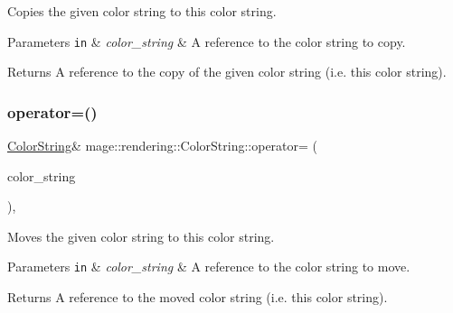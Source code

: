 Copies the given color string to this color string.


\begin{DoxyParams}[1]{Parameters}
\mbox{\tt in}  & {\em color\+\_\+string} & A reference to the color string to copy. \\
\hline
\end{DoxyParams}
\begin{DoxyReturn}{Returns}
A reference to the copy of the given color string (i.\+e. this color string). 
\end{DoxyReturn}
\hypertarget{classmage_1_1rendering_1_1_color_string_aa70b60e0c8528306e7473ee0b5bfbe03}{}\label{classmage_1_1rendering_1_1_color_string_aa70b60e0c8528306e7473ee0b5bfbe03} 
\subsubsection{\texorpdfstring{operator=()}{operator=()}\hspace{0.1cm}{\footnotesize\ttfamily [2/2]}}
{\footnotesize\ttfamily \hyperlink{classmage_1_1rendering_1_1_color_string}{Color\+String}\& mage\+::rendering\+::\+Color\+String\+::operator= (\begin{DoxyParamCaption}\item[{\hyperlink{classmage_1_1rendering_1_1_color_string}{Color\+String} \&\&}]{color\+\_\+string }\end{DoxyParamCaption})\hspace{0.3cm}{\ttfamily [default]}, {\ttfamily [noexcept]}}

Moves the given color string to this color string.


\begin{DoxyParams}[1]{Parameters}
\mbox{\tt in}  & {\em color\+\_\+string} & A reference to the color string to move. \\
\hline
\end{DoxyParams}
\begin{DoxyReturn}{Returns}
A reference to the moved color string (i.\+e. this color string). 
\end{DoxyReturn}
\hypertarget{classmage_1_1rendering_1_1_color_string_aefee43f68f87617976f89430bac71fba}{}\label{classmage_1_1rendering_1_1_color_string_aefee43f68f87617976f89430bac71fba} 
